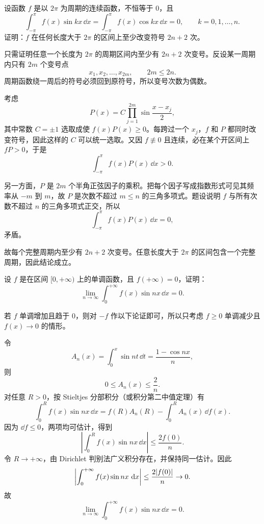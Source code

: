 \begin{xreferenceproblem}[11]
设函数 $f$ 是以 $2\pi$ 为周期的连续函数，不恒等于 0，且
  \[
    \int_{-\pi}^{\pi}f(x)\sin kx\,\dd x
    =\int_{-\pi}^{\pi}f(x)\cos kx\,\dd x=0,
    \qquad k=0,1,\ldots,n.
  \]
  证明：$f$ 在任何长度大于 $2\pi$ 的区间上至少改变符号 $2n+2$ 次。
\end{xreferenceproblem}
\begin{xsolution}
只需证明任意一个长度为 $2\pi$ 的周期区间内至少有 $2n+2$ 次变号。反设某一周期内只有 $2m$ 个变号点
\[
  x_1,x_2,\ldots,x_{2m},\qquad 2m\le2n.
\]
周期函数绕一周后的符号必须回到原符号，所以变号次数为偶数。

考虑
\[
  P(x)=C\prod_{j=1}^{2m}\sin\frac{x-x_j}{2},
\]
其中常数 $C=\pm1$ 选取成使 $f(x)P(x)\ge0$。每跨过一个 $x_j$，$f$ 和 $P$ 都同时改变符号，因此这样的 $C$ 可以统一选取。又因 $f\not\equiv0$ 且连续，必在某个开区间上 $fP>0$，于是
\[
  \int_{-\pi}^{\pi}f(x)P(x)\,\dd x>0.
\]

另一方面，$P$ 是 $2m$ 个半角正弦因子的乘积。把每个因子写成指数形式可见其频率从 $-m$ 到 $m$，故 $P$ 是次数不超过 $m\le n$ 的三角多项式。题设说明 $f$ 与所有次数不超过 $n$ 的三角多项式正交，所以
\[
  \int_{-\pi}^{\pi}f(x)P(x)\,\dd x=0,
\]
矛盾。

故每个完整周期内至少有 $2n+2$ 次变号。任意长度大于 $2\pi$ 的区间包含一个完整周期，因此结论成立。
\end{xsolution}


\begin{xreferenceproblem}[12]
设 $f$ 是在区间 $[0,+\infty)$ 上的单调函数，且 $f(+\infty)=0$，证明：
  \[
    \lim_{n\to\infty}\int_0^{+\infty}f(x)\sin nx\,\dd x=0.
  \]
\end{xreferenceproblem}
\begin{xsolution}
若 $f$ 单调增加且趋于 $0$，则对 $-f$ 作以下论证即可，所以只考虑 $f\ge0$ 单调减少且 $f(x)\to0$ 的情形。

令
\[
  A_n(x)=\int_0^x\sin nt\,\dd t=\frac{1-\cos nx}{n},
\]
则
\[
  0\le A_n(x)\le\frac2n.
\]
对任意 $R>0$，按 Stieltjes 分部积分（或积分第二中值定理）有
\[
  \int_0^Rf(x)\sin nx\,\dd x
  =f(R)A_n(R)-\int_0^RA_n(x)\,\dd f(x).
\]
因为 $\dd f\le0$，两项均可估计，得到
\[
  \left|\int_0^Rf(x)\sin nx\,\dd x\right|
  \le\frac{2f(0)}n.
\]
令 $R\to+\infty$，由 Dirichlet 判别法广义积分存在，并保持同一估计。因此
\[
  \left|\int_0^{+\infty}f(x)\sin nx\,\mathop{}\!\mathrm{d} x\right|
  \le\frac{2\lvert f(0)\rvert}n\to0.
\]
故
\[
  \boxed{\displaystyle
  \lim_{n\to\infty}\int_0^{+\infty}f(x)\sin nx\,\dd x=0 }.
\]
\end{xsolution}


